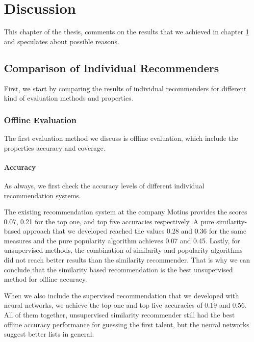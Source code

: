 
\chapter{Discussion}\label{chapter:discussion}

This chapter of the thesis, comments on the results that we achieved in chapter \ref{chapter:discussion} and speculates about possible reasons.

\section{Comparison of Individual Recommenders}

First, we start by comparing the results of individual recommenders for different kind of evaluation methods and properties.

\subsection{Offline Evaluation}

The first evaluation method we discuss is offline evaluation, which include the properties accuracy and coverage.

\subsubsection{Accuracy}\label{discussion:single-offline-accuracy}

As always, we first check the accuracy levels of different individual recommendation systems.

The existing recommendation system at the company Motius provides the scores 0.07, 0.21 for the top one, and top five accuracies respectively. A pure similarity-based approach that we developed reached the values 0.28 and 0.36 for the same measures and the pure popularity algorithm achieves 0.07 and 0.45. Lastly, for unsupervised methods, the combination of similarity and popularity algorithms did not reach better results than the similarity recommender. That is why we can conclude that the similarity based recommendation is the best unsupervised method for offline accuracy.

When we also include the supervised recommendation that we developed with neural networks, we achieve the top one and top five accuracies of 0.19 and 0.56. All of them together, unsupervised similarity recommender still had the best offline accuracy performance for guessing the first talent, but the neural networks suggest better lists in general.

